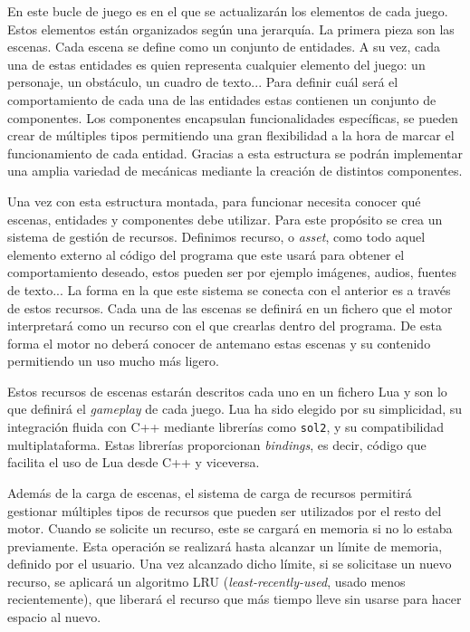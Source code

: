 \medskip  

En este bucle de juego es en el que se actualizarán los elementos de cada juego. Estos elementos están organizados según una jerarquía. La primera pieza son las escenas. Cada escena se define como un conjunto de entidades. A su vez, cada una de estas entidades es quien representa cualquier elemento del juego: un personaje, un obstáculo, un cuadro de texto... Para definir cuál será el comportamiento de cada una de las entidades estas contienen un conjunto de componentes. Los componentes encapsulan funcionalidades específicas, se pueden crear de múltiples tipos permitiendo una gran flexibilidad a la hora de marcar el funcionamiento de cada entidad. Gracias a esta estructura se podrán implementar una amplia variedad de mecánicas mediante la creación de distintos componentes.  

\medskip

Una vez con esta estructura montada, para funcionar necesita conocer qué escenas, entidades y componentes debe utilizar. Para este propósito se crea un sistema de gestión de recursos. Definimos recurso, o \textit{asset}, como todo aquel elemento externo al código del programa que este usará para obtener el comportamiento deseado, estos pueden ser por ejemplo imágenes, audios, fuentes de texto... La forma en la que este sistema se conecta con el anterior es a través de estos recursos. Cada una de las escenas se definirá en un fichero que el motor interpretará como un recurso con el que crearlas dentro del programa. De esta forma el motor no deberá conocer de antemano estas escenas y su contenido permitiendo un uso mucho más ligero.

\smallskip

Estos recursos de escenas estarán descritos cada uno en un fichero Lua y son lo que definirá el \textit{gameplay} de cada juego. Lua ha sido elegido por su simplicidad, su integración fluida con C++ mediante librerías como \texttt{sol2}, y su compatibilidad multiplataforma. Estas librerías proporcionan \textit{bindings}, es decir, código que facilita el uso de Lua desde C++ y viceversa.

\medskip

Además de la carga de escenas, el sistema de carga de recursos permitirá gestionar múltiples tipos de recursos que pueden ser utilizados por el resto del motor. Cuando se solicite un recurso, este se cargará en memoria si no lo estaba previamente. Esta operación se realizará hasta alcanzar un límite de memoria, definido por el usuario. Una vez alcanzado dicho límite, si se solicitase un nuevo recurso, se aplicará un algoritmo LRU (\textit{least-recently-used}, usado menos recientemente), que liberará el recurso que más tiempo lleve sin usarse para hacer espacio al nuevo.

